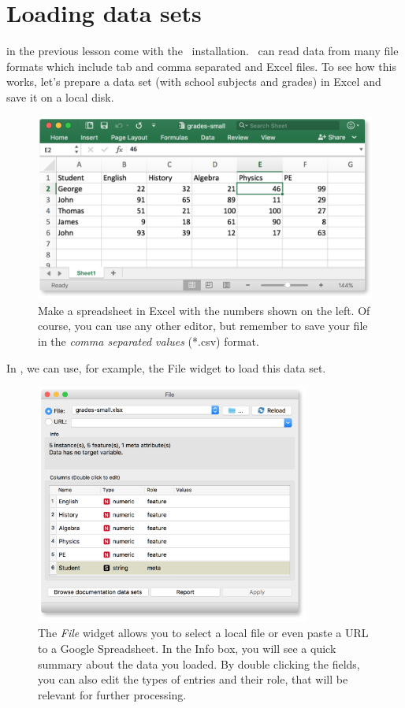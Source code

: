 \chapter{Loading data sets}
\label{ch:loading_data}

 in the previous lesson come with the \mutation\ installation. \mutation\ can read data from many file formats which include tab and comma separated and Excel files. To see how this works, let's prepare a data set (with school subjects and grades) in Excel and save it on a local disk.

\begin{figure}[h]
  \centering
  \includegraphics[width=\linewidth]{loading-fig1.png}%
  \caption{Make a spreadsheet in Excel with the numbers shown on the left. Of course, you can use any other editor, but remember to save your file in the \textit{comma separated values} (*.csv) format.}
  \label{fig:loading-fig1}
\end{figure}

In \mutation, we can use, for example, the File widget to load this data set.

\begin{figure}[h]
  \centering
  \includegraphics[width=90mm]{loading-fig2.png}%
  \caption{The \textit{File} widget allows you to select a local file or even paste a URL to a Google Spreadsheet. In the Info box, you will see a quick summary about the data you loaded. By double clicking the fields, you can also edit the types of entries and their role, that will be relevant for further processing.}
  \label{fig:loading-fig2}
\end{figure}

